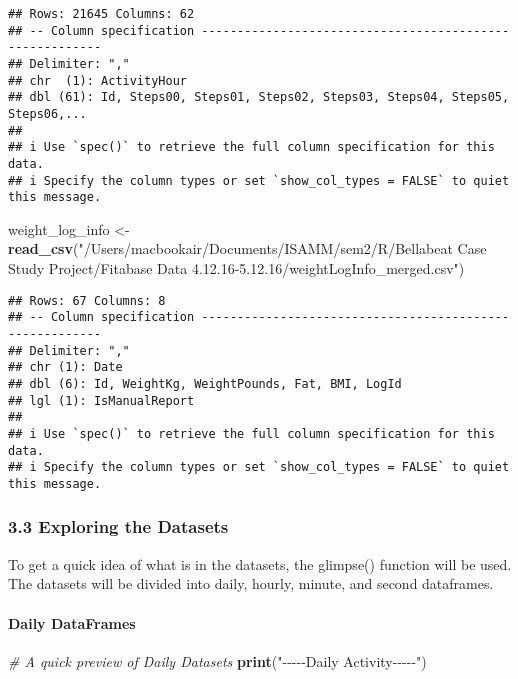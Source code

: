 \documentclass[
]{article}
\newenvironment{Shaded}{\begin{snugshade}}{\end{snugshade}}
\newcommand{\CommentTok}[1]{\textcolor[rgb]{0.56,0.35,0.01}{\textit{#1}}}
\newcommand{\FunctionTok}[1]{\textcolor[rgb]{0.13,0.29,0.53}{\textbf{#1}}}
\newcommand{\NormalTok}[1]{#1}
\newcommand{\OtherTok}[1]{\textcolor[rgb]{0.56,0.35,0.01}{#1}}
\newcommand{\StringTok}[1]{\textcolor[rgb]{0.31,0.60,0.02}{#1}}
\begin{document}
\begin{verbatim}
## Rows: 21645 Columns: 62
## -- Column specification --------------------------------------------------------
## Delimiter: ","
## chr  (1): ActivityHour
## dbl (61): Id, Steps00, Steps01, Steps02, Steps03, Steps04, Steps05, Steps06,...
## 
## i Use `spec()` to retrieve the full column specification for this data.
## i Specify the column types or set `show_col_types = FALSE` to quiet this message.
\end{verbatim}

\begin{Shaded}
\begin{Highlighting}[]
\NormalTok{weight\_log\_info }\OtherTok{\textless{}{-}} \FunctionTok{read\_csv}\NormalTok{(}\StringTok{"/Users/macbookair/Documents/ISAMM/sem2/R/Bellabeat Case Study Project/Fitabase Data 4.12.16{-}5.12.16/weightLogInfo\_merged.csv"}\NormalTok{)}
\end{Highlighting}
\end{Shaded}

\begin{verbatim}
## Rows: 67 Columns: 8
## -- Column specification --------------------------------------------------------
## Delimiter: ","
## chr (1): Date
## dbl (6): Id, WeightKg, WeightPounds, Fat, BMI, LogId
## lgl (1): IsManualReport
## 
## i Use `spec()` to retrieve the full column specification for this data.
## i Specify the column types or set `show_col_types = FALSE` to quiet this message.
\end{verbatim}

\hypertarget{exploring-the-datasets}{%
\subsubsection{3.3 Exploring the
Datasets}\label{exploring-the-datasets}}

To get a quick idea of what is in the datasets, the glimpse() function
will be used. The datasets will be divided into daily, hourly, minute,
and second dataframes.

\hypertarget{daily-dataframes}{%
\paragraph{Daily DataFrames}\label{daily-dataframes}}

\begin{Shaded}
\begin{Highlighting}[]
\CommentTok{\# A quick preview of Daily Datasets}
\FunctionTok{print}\NormalTok{(}\StringTok{"{-}{-}{-}{-}{-}Daily Activity{-}{-}{-}{-}{-}"}\NormalTok{)}
\end{Highlighting}
\end{Shaded}
\end{document}
